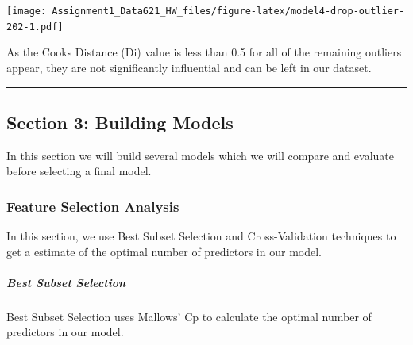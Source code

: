 \documentclass[
]{article}
\newenvironment{Shaded}{\begin{snugshade}}{\end{snugshade}}
\newcommand{\AttributeTok}[1]{\textcolor[rgb]{0.13,0.29,0.53}{#1}}
\newcommand{\DecValTok}[1]{\textcolor[rgb]{0.00,0.00,0.81}{#1}}
\newcommand{\FunctionTok}[1]{\textcolor[rgb]{0.13,0.29,0.53}{\textbf{#1}}}
\newcommand{\NormalTok}[1]{#1}
\newcommand{\OtherTok}[1]{\textcolor[rgb]{0.56,0.35,0.01}{#1}}
\newcommand{\SpecialCharTok}[1]{\textcolor[rgb]{0.81,0.36,0.00}{\textbf{#1}}}
\newcommand{\StringTok}[1]{\textcolor[rgb]{0.31,0.60,0.02}{#1}}
\begin{document}
\texttt{[image: Assignment1\_Data621\_HW\_files/figure-latex/model4-drop-outlier-202-1.pdf]}

As the Cooks Distance (Di) value is less than 0.5 for all of the
remaining outliers appear, they are not significantly influential and
can be left in our dataset.

\begin{center}\rule{0.5\linewidth}{0.5pt}\end{center}

\subsection{Section 3: Building Models}\label{section-3-building-models}

In this section we will build several models which we will compare and
evaluate before selecting a final model.

\subsubsection{Feature Selection
Analysis}\label{feature-selection-analysis}

In this section, we use Best Subset Selection and Cross-Validation
techniques to get a estimate of the optimal number of predictors in our
model.

\subparagraph{Best Subset Selection}\label{best-subset-selection}

Best Subset Selection uses Mallows' Cp to calculate the optimal number
of predictors in our model.

\begin{Shaded}
\end{Shaded}
\end{document}
